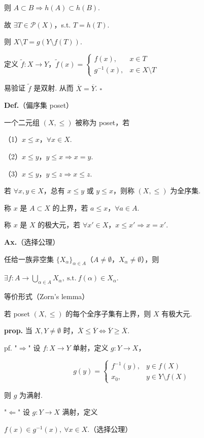 \documentclass[11pt]{ctexart}
\theoremstyle{definition}
\begin{document}
则 $A \subset B \Rightarrow h(A) \subset h(B)$.

故 $\exists T \in \mathcal{P}(X)$，s.t. $T = h(T)$.

则 $X \setminus T = g(Y \setminus f(T))$.

定义 $\widetilde{f}: X \to Y$，$\widetilde{f}(x) = \begin{cases} f(x), & x \in T \\ g^{-1}(x), & x \in X \setminus T \end{cases}$

易验证 $\widetilde{f}$ 是双射. 从而 $\overline{X} = \overline{Y}$. $\square$

\textbf{Def.}（偏序集 poset）

一个二元组 $(X, \leq)$ 被称为 poset，若

（1）$x \leq x$，$\forall x \in X$.

（2）$x \leq y$，$y \leq x \Rightarrow x = y$.

（3）$x \leq y$，$y \leq z \Rightarrow x \leq z$.

若 $\forall x, y \in X$，总有 $x \leq y$ 或 $y \leq x$，则称 $(X, \leq)$ 为全序集.

称 $x$ 是 $A \subset X$ 的上界，若 $a \leq x$，$\forall a \in A$.

称 $x$ 是 $X$ 的极大元，若 $\forall x' \in X$，$x \leq x' \Rightarrow x = x'$.

\textbf{Ax.}（选择公理）

任给一族非空集 $\{X_\alpha\}_{\alpha \in A}$（$A \neq \emptyset$，$X_\alpha \neq \emptyset$），则

$\exists f: A \to \bigcup_{\alpha \in A} X_\alpha,\ \text{s.t.}\ f(\alpha) \in X_\alpha.$

等价形式（Zorn's lemma）

若 poset $(X, \leq)$ 的每个全序子集有上界，则 $X$ 有极大元.

\textbf{prop.} 当 $X, Y \neq \emptyset$ 时，$\overline{X} \leq \overline{Y} \iff \overline{Y} \geq \overline{X}$.

pf. "$\Rightarrow$" 设 $f: X \to Y$ 单射，定义 $g: Y \to X$，

\[
g(y) = \begin{cases} f^{-1}(y), & y \in f(X) \\ x_0, & y \in Y \setminus f(X) \end{cases}
\]

则 $g$ 为满射.

"$\Leftarrow$" 设 $g: Y \to X$ 满射，定义

$f(x) \in g^{-1}(x),\ \forall x \in X$.（选择公理）
\end{document}

